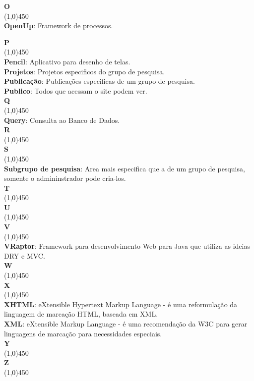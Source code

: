 \documentclass[11pt, a4paper]{article}
\begin{document}
	\noindent\textbf{\huge{O}}\\
	\line(1,0){450}\\
	\textbf{OpenUp}: Framework de processos.\\
	\newpage
	
	\noindent\textbf{\huge{P}}\\
	\line(1,0){450}\\
	\textbf{Pencil}: Aplicativo para desenho de telas.\\
	\textbf{Projetos}: Projetos especificos do grupo de pesquisa.\\
	\textbf{Publicação}: Publicações especificas de um grupo de pesquisa.\\
	\textbf{Publico}: Todos que acessam o site podem ver.\\
	
	\noindent\textbf{\huge{Q}}\\
	\line(1,0){450}\\
	\textbf{Query}: Consulta ao Banco de Dados.\\
	
	\noindent\textbf{\huge{R}}\\
	\line(1,0){450}\\
	
	\noindent\textbf{\huge{S}}\\
	\line(1,0){450}\\
	\textbf{Subgrupo de pesquisa}: Area mais especifica que a de um grupo de 
	pesquisa, somente o admininstrador pode cria-los.\\
		
	\noindent\textbf{\huge{T}}\\
	\line(1,0){450}\\
		
	\noindent\textbf{\huge{U}}\\
	\line(1,0){450}\\
		
	\noindent\textbf{\huge{V}}\\
	\line(1,0){450}\\
	\textbf{VRaptor}: Framework para desenvolvimento Web para Java que utiliza 
	as ideias DRY e MVC.\\
	
	\noindent\textbf{\huge{W}}\\
	\line(1,0){450}\\
		
	\noindent\textbf{\huge{X}}\\
	\line(1,0){450}\\
	\textbf{XHTML}: eXtensible Hypertext Markup Language - é uma reformulação 
	da linguagem de marcação HTML, baseada em XML.\\
	\textbf{XML}: eXtensible Markup Language - é uma recomendação da W3C para 
	gerar linguagens de marcação para necessidades especiais.\\
	
	\noindent\textbf{\huge{Y}}\\
	\line(1,0){450}\\
		
	\noindent\textbf{\huge{Z}}\\
	\line(1,0){450}\\
	
\end{document}
